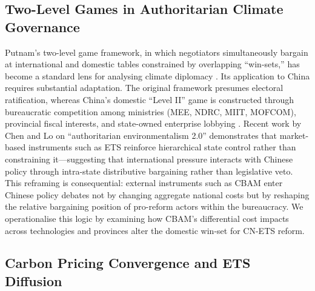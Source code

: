 \documentclass[letterpaper, 10pt, conference]{ieeeconf}
\begin{document}
\subsection{Two-Level Games in Authoritarian Climate Governance}
\label{sec:lit-twolevel}

Putnam's \citeyearpar{Putnam1988} two-level game framework, in which negotiators simultaneously bargain at international and domestic tables constrained by overlapping ``win-sets,'' has become a standard lens for analysing climate diplomacy \citep{Bailer2012}. Its application to China requires substantial adaptation. The original framework presumes electoral ratification, whereas China's domestic ``Level II'' game is constructed through bureaucratic competition among ministries (MEE, NDRC, MIIT, MOFCOM), provincial fiscal interests, and state-owned enterprise lobbying \citep{Feng2021,Gilley2012}. Recent work by Chen and Lo \citeyearpar{ChenLo2025} on ``authoritarian environmentalism 2.0'' demonstrates that market-based instruments such as ETS reinforce hierarchical state control rather than constraining it---suggesting that international pressure interacts with Chinese policy through intra-state distributive bargaining rather than legislative veto. This reframing is consequential: external instruments such as CBAM enter Chinese policy debates not by changing aggregate national costs but by reshaping the relative bargaining position of pro-reform actors within the bureaucracy. We operationalise this logic by examining how CBAM's differential cost impacts across technologies and provinces alter the domestic win-set for CN-ETS reform.

\subsection{Carbon Pricing Convergence and ETS Diffusion}
\label{sec:lit-convergence}
\end{document}
